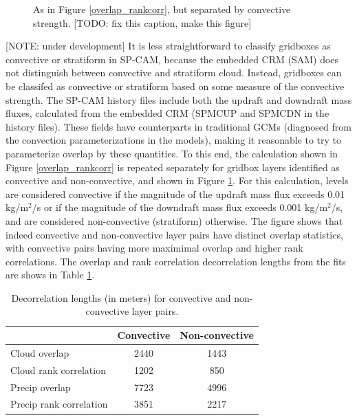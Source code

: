 \begin{figure}
\centering
\caption{As in Figure \ref{overlap_rankcorr}, but separated by convective strength. [TODO: fix this caption, make this figure]}
\label{overlap_rankcorr_convective}
\end{figure}
[NOTE: under development] It is less straightforward to classify gridboxes as convective or stratiform in SP-CAM, because the embedded CRM (SAM) does not distinguish between convective and stratiform cloud. Instead, gridboxes can be classifed as convective or stratiform based on some measure of the convective strength. The SP-CAM history files include both the updraft and downdraft mass fluxes, calculated from the embedded CRM (SPMCUP and SPMCDN in the history files). These fields have counterparts in traditional GCMs (diagnosed from the convection parameterizations in the models), making it reasonable to try to parameterize overlap by these quantities. To this end, the calculation shown in Figure \ref{overlap_rankcorr} is repeated separately for gridbox layers identified as convective and non-convective, and shown in Figure \ref{overlap_rankcorr_convective}. For this calculation, levels are considered convective if the magnitude of the updraft mass flux exceeds 0.01 kg/m$^2$/s or if the magnitude of the downdraft mass flux exceeds 0.001 kg/m$^2$/s, and are considered non-convective (stratiform) otherwise. The figure shows that indeed convective and non-convective layer pairs have distinct overlap statistics, with convective pairs having more maximimal overlap and higher rank correlations. The overlap and rank correlation decorrelation lengths from the fits are shows in Table \ref{subgrid2_overlap_conv_table}.

\begin{table}
\centering
\begin{tabular}{lcc}
                        & Convective    & Non-convective \\ \hline
Cloud overlap           & 2440          & 1443 \\
Cloud rank correlation  & 1202          & 850  \\
Precip overlap          & 7723          & 4996 \\
Precip rank correlation & 3851          & 2217 \\
\end{tabular}
\caption{Decorrelation lengths (in meters) for convective and non-convective layer pairs.}
\label{subgrid2_overlap_conv_table}
\end{table}

